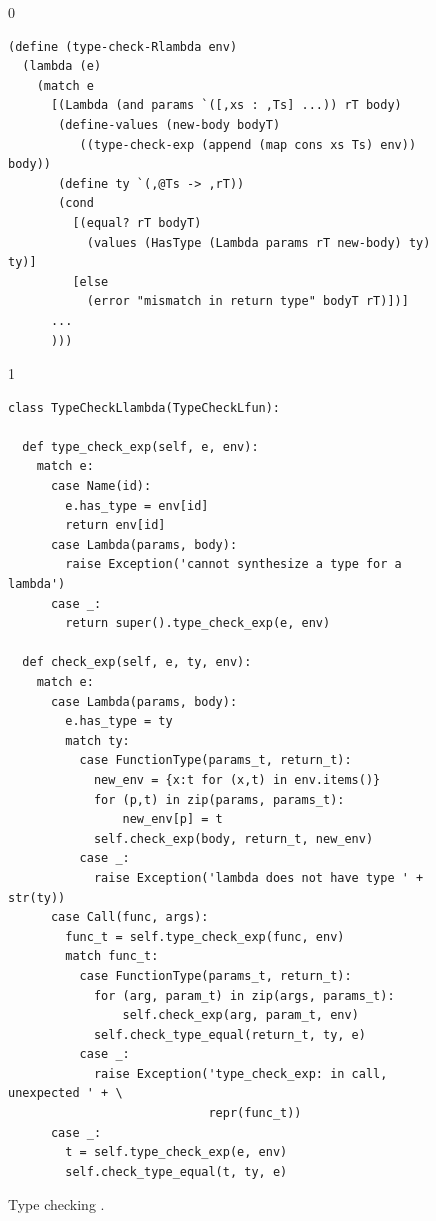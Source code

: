 \documentclass[7x10,nocrop]{TimesAPriori_MIT}%
\def\racketEd{0}
\def\pythonEd{1}
\def\edition{1}
\newcommand{\python}[1]{{\if\edition\pythonEd #1\fi}}
\begin{document}
\begin{figure}[tbp]
{\if\edition\racketEd 
\begin{lstlisting}
(define (type-check-Rlambda env)
  (lambda (e)
    (match e
      [(Lambda (and params `([,xs : ,Ts] ...)) rT body)
       (define-values (new-body bodyT) 
          ((type-check-exp (append (map cons xs Ts) env)) body))
       (define ty `(,@Ts -> ,rT))
       (cond
         [(equal? rT bodyT)
           (values (HasType (Lambda params rT new-body) ty) ty)]
         [else
           (error "mismatch in return type" bodyT rT)])]
      ...
      )))
\end{lstlisting}
\fi}
{\if\edition\pythonEd 
\begin{lstlisting}
class TypeCheckLlambda(TypeCheckLfun):

  def type_check_exp(self, e, env):
    match e:
      case Name(id):
        e.has_type = env[id]
        return env[id]
      case Lambda(params, body):
        raise Exception('cannot synthesize a type for a lambda')
      case _:
        return super().type_check_exp(e, env)
    
  def check_exp(self, e, ty, env):
    match e:
      case Lambda(params, body):
        e.has_type = ty
        match ty:
          case FunctionType(params_t, return_t):
            new_env = {x:t for (x,t) in env.items()}
            for (p,t) in zip(params, params_t):
                new_env[p] = t
            self.check_exp(body, return_t, new_env)
          case _:
            raise Exception('lambda does not have type ' + str(ty))
      case Call(func, args):
        func_t = self.type_check_exp(func, env)
        match func_t:
          case FunctionType(params_t, return_t):
            for (arg, param_t) in zip(args, params_t):
                self.check_exp(arg, param_t, env)
            self.check_type_equal(return_t, ty, e)
          case _:
            raise Exception('type_check_exp: in call, unexpected ' + \
                            repr(func_t))
      case _:
        t = self.type_check_exp(e, env)
        self.check_type_equal(t, ty, e)
\end{lstlisting}
\fi}
\caption{Type checking \LangLam{}\python{, part 1}.}
\label{fig:type-check-Llambda}
\end{figure}
\end{document}
